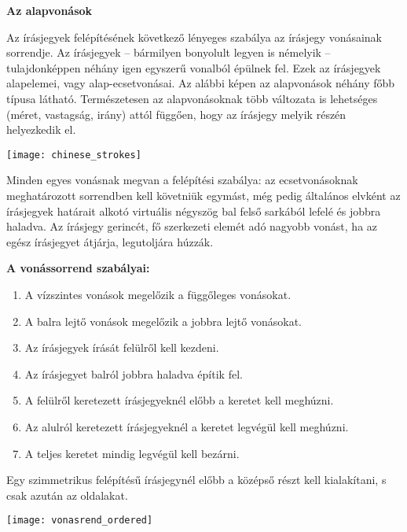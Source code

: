 
{\large \textbf{Az alapvonások}}

Az írásjegyek felépítésének következő lényeges szabálya az írásjegy vonásainak sorrendje. Az írásjegyek – bármilyen bonyolult legyen is némelyik – tulajdonképpen néhány igen egyszerű vonalból épülnek fel. Ezek az írásjegyek alapelemei, vagy alap-ecsetvonásai. Az alábbi képen az alapvonások néhány főbb típusa látható. Természetesen az alapvonásoknak több változata is lehetséges (méret, vastagság, irány) attól függően, hogy az írásjegy melyik részén helyezkedik el.

\begin{center}
	\texttt{[image: chinese\_strokes]}
\end{center}

Minden egyes vonásnak megvan a felépítési szabálya: az ecsetvonásoknak meghatározott sorrendben kell követniük egymást, még pedig általános elvként az írásjegyek határait alkotó virtuális négyszög bal felső sarkából lefelé és jobbra haladva. Az írásjegy gerincét, fő szerkezeti elemét adó nagyobb vonást, ha az egész írásjegyet átjárja, legutoljára húzzák.

\newpage
{\large \textbf{A vonássorrend szabályai: }}
\begin{enumerate}
	\item A vízszintes vonások megelőzik a függőleges vonásokat.
	\item A balra lejtő vonások megelőzik a jobbra lejtő vonásokat. 
	\item Az írásjegyek írását felülről kell kezdeni. 
	\item Az írásjegyet balról jobbra haladva építik fel. 
	\item A felülről keretezett írásjegyeknél előbb a keretet kell meghúzni. 
	\item Az alulról keretezett írásjegyeknél a keretet legvégül kell meghúzni. 
	\item A teljes keretet mindig legvégül kell bezárni.
\end{enumerate}

Egy szimmetrikus felépítésű írásjegynél előbb a középső részt kell kialakítani, s csak azután az oldalakat.

\begin{center}
	\texttt{[image: vonasrend\_ordered]}
\end{center}

